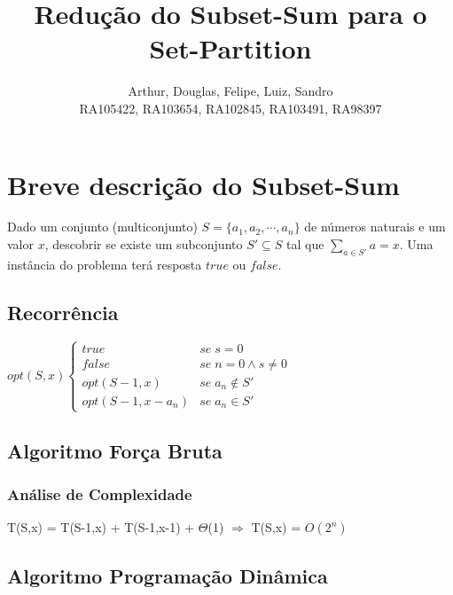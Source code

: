 \documentclass[12pt]{article}
\title{Redução do Subset-Sum para o Set-Partition}
\author{Arthur, Douglas, Felipe, Luiz, Sandro\\
RA105422, RA103654, RA102845, RA103491, RA98397}
\begin{document}
 

\maketitle

\section{Breve descrição do Subset-Sum}

Dado um conjunto (multiconjunto) $S = \{a_1,a_2,\cdots, a_n\}$ de números naturais e um valor $x$, descobrir se existe um subconjunto $S'\subseteq S$ tal que $\displaystyle\sum_{a \in S'} a = x$. Uma instância do problema terá resposta $true$ ou $false$.

\subsection{Recorrência}

$opt(S,x)\left\{\begin {matrix}
true & se\;s=0\\
false & se\;n = 0 \wedge s\neq 0\\
opt(S-1,x) & se\;a_n \not\in S'\\
opt(S-1,x-a_n) & se\;a_n \in S'
\end{matrix}\right.$

\subsection{Algoritmo Força Bruta}

\begin{algorithm}[H]
\end{algorithm}

\subsubsection{Análise de Complexidade}

T(S,x) = T(S-1,x) + T(S-1,x-1) + $\Theta$(1) $\Rightarrow$ T(S,x) = $O(2^n)$
\subsection{Algoritmo Programação Dinâmica}
\end{document}
